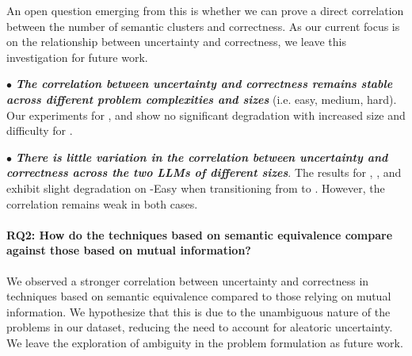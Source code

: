 An open question emerging from this is whether we can prove a direct correlation between the number of semantic clusters and correctness. As our current focus is on the relationship between uncertainty and correctness, we leave this investigation for future work.

$\bullet$ \emph{\textbf{The correlation between uncertainty and correctness remains stable across different problem complexities and sizes}} (i.e. easy, medium, hard). Our experiments for \SESymbolic, \SESymbolicUnif and \MISymbolic show no significant degradation with increased size and difficulty for \gptturbo.

$\bullet$ \emph{\textbf{There is little variation in the correlation between uncertainty and correctness across the two LLMs of different sizes}}. The results for \SESymbolic, \SESymbolicUnif, and \MISymbolic exhibit slight degradation on \livecodebench-Easy when transitioning from \gptturbo to \codegenmonoC.  However, the correlation remains weak in both cases.



\paragraph{RQ2: How do the techniques based on semantic equivalence compare against those based on mutual information?}


We observed a stronger correlation between uncertainty and correctness in techniques based on semantic equivalence compared to those relying on mutual information. We hypothesize that this is due to the unambiguous nature of the problems in our dataset, reducing the need to account for aleatoric uncertainty. We leave the exploration of ambiguity in the problem formulation as future work.

